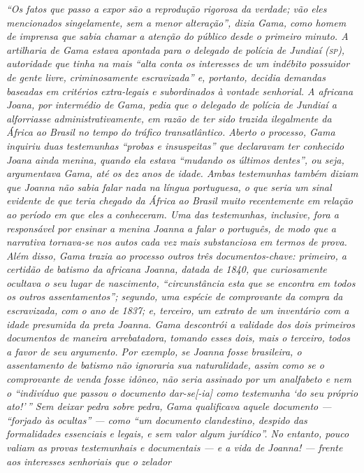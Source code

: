 \begin{didascalia}
\emph{``Os fatos que passo a expor são a reprodução rigorosa da verdade;
vão eles mencionados singelamente, sem a menor alteração'', dizia Gama,
como homem de imprensa que sabia chamar a atenção do público desde o
primeiro minuto. A artilharia de Gama estava apontada para o delegado de
polícia de Jundiaí (\textsc{sp}), autoridade que tinha na mais ``alta conta os
interesses de um indébito possuidor de gente livre, criminosamente
escravizada'' e, portanto, decidia demandas baseadas em critérios
extra-legais e subordinados à vontade senhorial. A africana Joana, por
intermédio de Gama, pedia que o delegado de polícia de Jundiaí a
alforriasse administrativamente, em razão de ter sido trazida
ilegalmente da África ao Brasil no tempo do tráfico transatlântico.
Aberto o processo, Gama inquiriu duas testemunhas ``probas e insuspeitas''
que declaravam ter conhecido Joana ainda menina, quando ela estava
``mudando os últimos dentes'', ou seja, argumentava Gama, até os dez anos
de idade. Ambas testemunhas também diziam que Joanna não sabia falar
nada na língua portuguesa, o que seria um sinal evidente de que teria
chegado da África ao Brasil muito recentemente em relação ao período em
que eles a conheceram. Uma das testemunhas, inclusive, fora a
responsável por ensinar a menina Joanna a falar o português, de modo que
a narrativa tornava-se nos autos cada vez mais substanciosa em termos de
prova. Além disso, Gama trazia ao processo outros três documentos-chave:
primeiro, a certidão de batismo da africana Joanna, datada de 1840, que
curiosamente ocultava o seu lugar de nascimento, ``circunstância esta que
se encontra em todos os outros assentamentos''; segundo, uma espécie de
comprovante da compra da escravizada, com o ano de 1837; e, terceiro, um
extrato de um inventário com a idade presumida da preta Joanna. Gama
descontrói a validade dos dois primeiros documentos de maneira
arrebatadora, tomando esses dois, mais o terceiro, todos a favor de seu
argumento. Por exemplo, se Joanna fosse brasileira, o assentamento de
batismo não ignoraria sua naturalidade, assim como se o comprovante de
venda fosse idôneo, não seria assinado por um analfabeto e nem o
``indivíduo que passou o documento dar-se{[}-ia{]} como testemunha `do
seu próprio ato!'\,'' Sem deixar pedra sobre pedra, Gama qualificava aquele
documento --- ``forjado às ocultas'' --- como ``um documento clandestino,
despido das formalidades essenciais e legais, e sem valor algum
jurídico''. No entanto, pouco valiam as provas testemunhais e documentais
--- e a vida de Joanna! --- frente aos interesses senhoriais que o zelador
}
\end{didascalia}
